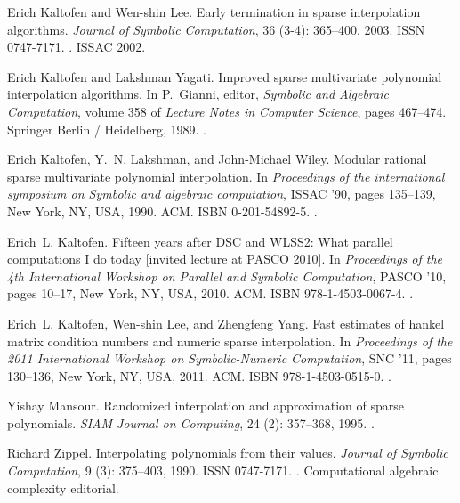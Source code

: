 \documentclass[letterpaper,10pt]{article}
\begin{document}
\begin{thebibliography}{21}
Erich Kaltofen and {Wen-shin} Lee.
\newblock Early termination in sparse interpolation algorithms.
\newblock \emph{Journal of Symbolic Computation}, 36 (3-4):
  365--400, 2003.
\newblock ISSN 0747-7171.
\newblock {}.
\newblock ISSAC 2002.

Erich Kaltofen and Lakshman Yagati.
\newblock Improved sparse multivariate polynomial interpolation algorithms.
\newblock In P.~Gianni, editor, \emph{Symbolic and Algebraic Computation},
  volume 358 of \emph{Lecture Notes in Computer Science}, pages 467--474.
  Springer Berlin / Heidelberg, 1989.
\newblock {}.

Erich Kaltofen, Y.~N. Lakshman, and John-Michael Wiley.
\newblock Modular rational sparse multivariate polynomial interpolation.
\newblock In \emph{Proceedings of the international symposium on Symbolic and
  algebraic computation}, ISSAC '90, pages 135--139, New York, NY, USA, 1990.
  ACM.
\newblock ISBN 0-201-54892-5.
\newblock {}.

Erich~L. Kaltofen.
\newblock Fifteen years after {DSC} and {WLSS2}: {W}hat parallel computations
  {I} do today [invited lecture at {PASCO} 2010].
\newblock In \emph{Proceedings of the 4th International Workshop on Parallel
  and Symbolic Computation}, PASCO '10, pages 10--17, New York, NY, USA, 2010.
  ACM.
\newblock ISBN 978-1-4503-0067-4.
\newblock {}.

Erich~L. Kaltofen, Wen-shin Lee, and Zhengfeng Yang.
\newblock Fast estimates of hankel matrix condition numbers and numeric sparse
  interpolation.
\newblock In \emph{Proceedings of the 2011 International Workshop on
  Symbolic-Numeric Computation}, SNC '11, pages 130--136, New York, NY, USA,
  2011. ACM.
\newblock ISBN 978-1-4503-0515-0.
\newblock {}.

Yishay Mansour.
\newblock Randomized interpolation and approximation of sparse polynomials.
\newblock \emph{SIAM Journal on Computing}, 24 (2): 357--368,
  1995.
\newblock {}.

Richard Zippel.
\newblock Interpolating polynomials from their values.
\newblock \emph{Journal of Symbolic Computation}, 9 (3):
  375--403, 1990.
\newblock ISSN 0747-7171.
\newblock {}.
\newblock Computational algebraic complexity editorial.

\end{thebibliography}
\end{document}
